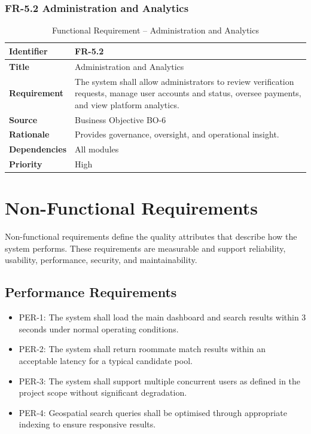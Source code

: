 \subsubsection{FR-5.2 Administration and Analytics}

\begin{table}[h]
\centering
\caption{Functional Requirement -- Administration and Analytics}

\begin{tabularx}{\textwidth}{|>{\raggedright\arraybackslash}p{3cm}|X|}
\hline
\textbf{Identifier} & FR-5.2 \\
\hline
\textbf{Title} & Administration and Analytics \\
\hline
\textbf{Requirement} & The system shall allow administrators to review verification requests, manage user accounts and status, oversee payments, and view platform analytics. \\
\hline
\textbf{Source} & Business Objective BO-6 \\
\hline
\textbf{Rationale} & Provides governance, oversight, and operational insight. \\
\hline
\textbf{Dependencies} & All modules \\
\hline
\textbf{Priority} & High \\
\hline
\end{tabularx}

\end{table}

\section{Non-Functional Requirements}

Non-functional requirements define the quality attributes that describe how the system performs. These requirements are measurable and support reliability, usability, performance, security, and maintainability.

\subsection{Performance Requirements}

\begin{itemize}
\item PER-1: The system shall load the main dashboard and search results within 3 seconds under normal operating conditions.
\item PER-2: The system shall return roommate match results within an acceptable latency for a typical candidate pool.
\item PER-3: The system shall support multiple concurrent users as defined in the project scope without significant degradation.
\item PER-4: Geospatial search queries shall be optimised through appropriate indexing to ensure responsive results.
\end{itemize}

